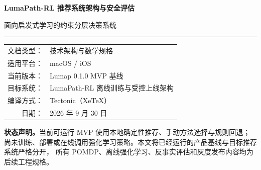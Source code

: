\documentclass[11pt,a4paper,fontset=none]{ctexart}
\newcommand{\1}{\mathbb{I}}
\begin{document}
\hypersetup{pageanchor=false}

\begin{titlepage}
  \centering
  \vspace*{24mm}
  {\sffamily\bfseries\fontsize{27}{34}\selectfont\color{LumapInk}
    LumaPath-RL 推荐系统架构与安全评估\par}
  \vspace{5mm}
  {\sffamily\Large\color{LumapBlue}
    面向启发式学习的约束分层决策系统\par}
  \vspace{16mm}
  \rule{0.68\textwidth}{0.6pt}\par
  \vspace{10mm}
  \begin{tabular}{rl}
    文档类型： & 技术架构与数学规格 \tabularnewline
    适用平台： & macOS / iOS \tabularnewline
    当前版本： & Lumap 0.1.0 MVP 基线 \tabularnewline
    目标系统： & LumaPath-RL 离线训练与受控上线架构 \tabularnewline
    编译方式： & Tectonic（XeTeX） \tabularnewline
    日期： & 2026 年 9 月 30 日 \tabularnewline
  \end{tabular}
  \vfill
  \begin{minipage}{0.82\textwidth}
    \small\color{LumapGrey}
    \textbf{状态声明。}当前可运行 MVP 使用本地确定性推荐、手动方法选择与规则回退；
    尚未训练、部署或在线调用强化学习策略。本文将已经运行的产品基线与目标推荐系统严格分开，
    所有 POMDP、离线强化学习、反事实评估和灰度发布内容均为后续工程规格。
  \end{minipage}
  \vspace{12mm}
\end{titlepage}
\hypersetup{pageanchor=true}

\begin{abstract}
Lumap 的推荐问题不是单步内容排序，而是在用户目标、知识状态、时间预算、可访问性、设备能力与
授权持续变化的条件下，选择下一项学习活动并积累可验证证据。本文给出 LumaPath-RL 的目标架构：
首页发现采用带硬约束的 contextual slate bandit，Learning Studio 采用 belief-state POMDP/SMDP，
并将层级动作拆为学习意图、概念、方法、剂量和具体内容。系统以长期掌握、延迟保持、迁移、
自主性和目标进展为奖励，以年龄适宜性、隐私授权、认知负荷、内容安全及用户明确选择为独立
CMDP 成本约束。训练流程采用监督知识状态建模、twin critics、Conservative Q-Learning、行为约束
actor、constraint critics 与拉格朗日乘子；上线前使用 IPS、SNIPS、DR、WDR、有效样本量和
bootstrap 置信区间执行反事实评估。本文同时定义数据合同、可观测性、硬门槛、回滚条件和当前
MVP 到目标系统的分阶段路径。

\noindent\textbf{关键词：}自适应学习；POMDP；CMDP；Offline RL；CQL；知识追踪；OPE；安全推荐
\end{abstract}
\end{document}
